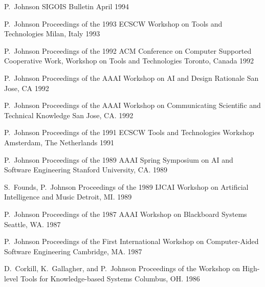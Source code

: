 \documentclass[11pt,letterpaper,sans]{moderncv} %
\begin{document}
          {P.~Johnson}
          {SIGOIS Bulletin}
          {April 1994}

          {P.~Johnson}
          {Proceedings of the 1993 ECSCW Workshop on Tools and Technologies}
          {Milan, Italy 1993}

          {P.~Johnson}
          {Proceedings of the 1992 ACM Conference on Computer Supported Cooperative Work, Workshop on Tools and Technologies}
          {Toronto, Canada 1992}

          {P.~Johnson}
          {Proceedings of the AAAI Workshop on AI and Design Rationale}
          {San Jose, CA 1992}

          {P.~Johnson}
          {Proceedings of the AAAI Workshop on Communicating Scientific and Technical Knowledge}
          {San Jose, CA. 1992}

          {P.~Johnson}
          {Proceedings of the 1991 ECSCW Tools and Technologies Workshop}
          {Amsterdam, The Netherlands 1991}

          {P.~Johnson}
          {Proceedings of the 1989 AAAI Spring Symposium on AI and Software Engineering}
          {Stanford University, CA. 1989}

          {S.~Founds, P.~Johnson}
          {Proceedings of the 1989 IJCAI Workshop on Artificial Intelligence and Music}
          {Detroit, MI. 1989}

          {P.~Johnson}
          {Proceedings of the 1987 AAAI Workshop on Blackboard Systems}
          {Seattle, WA. 1987}

          {P.~Johnson}
          {Proceedings of the First International Workshop on Computer-Aided Software Engineering}
          {Cambridge, MA. 1987}

          {D.~Corkill, K.~Gallagher, and P.~Johnson}
          {Proceedings of the Workshop on High-level Tools for Knowledge-based Systems}
          {Columbus, OH. 1986}
\end{document}
